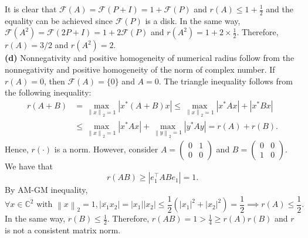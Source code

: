 \documentclass[11pt]{article}
\theoremstyle{plain}
\theoremstyle{definition}
\theoremstyle{remark}
\newcommand{\norm}[1]{\left\lVert #1 \right\rVert}
\newcommand{\C}{\mathbb{C}}
\newcommand{\tuple}[1]{\left(#1\right)}
\newcommand{\tp}{\tuple}
\newcommand{\abs}[1]{\left\vert#1\right\vert}
\def\+#1{\mathcal{#1}} %
\begin{document}
It is clear that $\+F(A) = \+F(P+I) = 1+\+F(P)$ and $r(A) \leq 1 + \frac 12$ and the equality can be achieved since $\+F(P)$ is a disk.
In the same way,  $\+F(A^2) = \+F(2P+I) = 1+2\+F(P)$ and $r(A^2) = 1+2\times \frac 12$.
Therefore, $r(A) = 3/2$ and $r(A^2) = 2$.
\\\textbf{(d)} Nonnegativity and positive homogeneity of numerical radius follow from the nonnegativity and positive homogeneity of the norm of complex number.
If $r(A) = 0$, then $\+F(A) = \{0\}$ and $A = 0$.
The triangle inequality follows from the following inequality:
\begin{align*}
    r(A+B) &= \max_{\norm{x}_2=1}\abs{x^*(A+B)x}
    \leq \max_{\norm{x}_2=1}\abs{x^*Ax}+\abs{x^*Bx}
    \\&\leq \max_{\norm{x}_2=1}\abs{x^*Ax}+\max_{\norm{y}_2=1}\abs{y^*Ay}
    = r(A)+r(B).
\end{align*}
Hence, $r(\cdot)$ is a norm.
However, consider $A = \begin{pmatrix} 0 & 1 \\ 0 & 0 \end{pmatrix}$ and $B = \begin{pmatrix} 0 & 0 \\ 1 & 0 \end{pmatrix}$.
We have that
$$
    r(AB) \geq |e_1^\top AB e_1| = 1.
$$
By AM-GM inequality,
$$
    \forall x\in \C^2 \text{ with }\norm{x}_2 = 1, \abs{\overline{x_1}x_2} = \abs{x_1}\abs{x_2} \leq \frac 12\tp{\abs{x_1}^2+\abs{x_2}^2} = \frac 12 \implies r(A) \leq \frac 12.
$$
In the same way, $r(B)\leq \frac 12$.
Therefore, $r(AB) = 1 > \frac 14 \geq r(A)r(B)$ and $r$ is not a consistent matrix norm.
\end{document}
